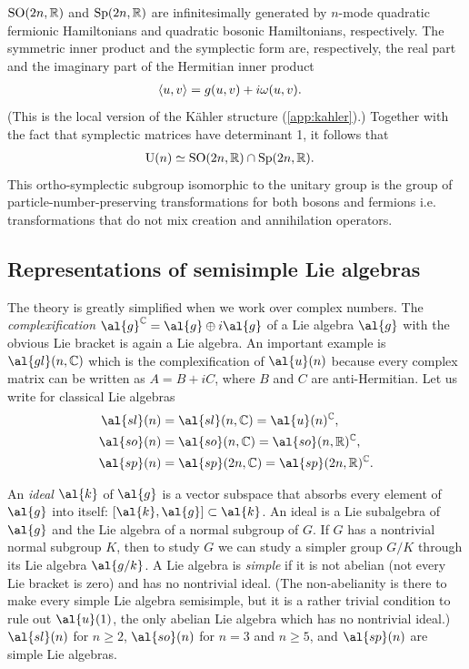 $\text{SO}(2n,\mathbb{R})$ and $\text{Sp}(2n,\mathbb{R})$ are infinitesimally generated by $n$-mode quadratic fer\-mi\-on\-ic Hamiltonians and quadratic bosonic Hamiltonians, respectively.
The symmetric inner product and the symplectic form are, respectively, the real part and the imaginary part of the Hermitian inner product
\begin{align}
\braket{u,v} &= g(u,v) + i\omega(u,v).
\end{align}
(This is the local version of the K{\"a}hler structure (\autoref{app:kahler}).) Together with the fact that symplectic matrices have determinant 1, it follows that
\begin{align}\label{2-out-of-3-property}
\gr{U}{n} &\simeq \gr{SO}{2n,\mathbb{R}} \cap \gr{Sp}{2n,\mathbb{R}}.
\end{align}
This ortho-symplectic subgroup isomorphic to the unitary group is the group of particle-number-pre\-serv\-ing transformations for both bosons and fermions i.e. transformations that do not mix creation and annihilation operators.

\subsection{Representations of semisimple Lie algebras}\label{ch2:semisimple}

The theory is greatly simplified when we work over complex numbers. The \emph{complexification} $\al{g}^{\mathbb{C}} = \al{g} \oplus i\al{g}$ of a Lie algebra $\al{g}$ with the obvious Lie bracket is again a Lie algebra. An important example is $\al{gl}(n,\mathbb{C})$ which is the complexification of $\al{u}(n)$ because every complex matrix can be written as $A = B +iC$, where $B$ and $C$ are anti-Hermitian. Let us write for classical Lie algebras
\begin{align}
\al{sl}(n) &= \al{sl}(n,\mathbb{C}) = \al{u}(n)^{\mathbb{C}}, \\
\al{so}(n) &= \al{so}(n,\mathbb{C}) = \al{so}(n,\mathbb{R})^{\mathbb{C}}, \\
\al{sp}(n) &= \al{sp}(2n,\mathbb{C}) = \al{sp}(2n,\mathbb{R})^{\mathbb{C}}.
\end{align}

An \emph{ideal} $\al{k}$ of $\al{g}$ is a vector subspace
that absorbs every element of $\al{g}$ into itself: $[\al{k},\al{g}] \subset \al{k}$.
An ideal is a Lie subalgebra of $\al{g}$ and the Lie algebra of a normal subgroup of $G$. If $G$ has a nontrivial normal subgroup $K$, then to study $G$ we can study a simpler group $G/K$ through its Lie algebra $\al{g/k}$. A Lie algebra is \emph{simple} if it is not abelian (not every Lie bracket is zero) and has no nontrivial ideal. (The non-abelianity is there to make every simple Lie algebra semisimple, but it is a rather trivial condition to rule out $\al{u}(1)$, the only abelian Lie algebra which has no nontrivial ideal.) $\al{sl}(n)$ for $n \ge 2$, $\al{so}(n)$ for $n=3$ and $n \ge 5$, and $\al{sp}(n)$ are simple Lie algebras.

